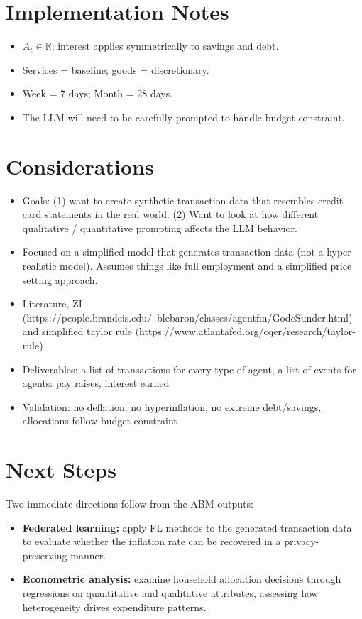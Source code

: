 \documentclass[12pt]{article}
\begin{document}
\section{Implementation Notes}
\begin{itemize}
\item $A_t\in\mathbb{R}$; interest applies symmetrically to savings and debt.
\item Services = baseline; goods = discretionary.
\item Week = 7 days; Month = 28 days.
\item The LLM will need to be carefully prompted to handle budget constraint.
\end{itemize}

\section{Considerations}
\begin{itemize}
    \item Goals: (1) want to create synthetic transaction data that resembles credit card statements in the real world. (2) Want to look at how different qualitative / quantitative prompting affects the LLM behavior.
    \item Focused on a simplified model that generates transaction data (not a hyper realistic model). Assumes things like full employment and a simplified price setting approach.
    \item Literature, ZI (https://people.brandeis.edu/~blebaron/classes/agentfin/GodeSunder.html) and simplified taylor rule (https://www.atlantafed.org/cqer/research/taylor-rule)
    \item Deliverables: a list of transactions for every type of agent, a list of events for agents: pay raises, interest earned
    \item Validation: no deflation, no hyperinflation, no extreme debt/savings, allocations follow budget constraint
\end{itemize}

\section{Next Steps}
Two immediate directions follow from the ABM outputs:

\begin{itemize}
    \item \textbf{Federated learning:} apply FL methods to the generated transaction data to evaluate whether the inflation rate can be recovered in a privacy-preserving manner.
    \item \textbf{Econometric analysis:} examine household allocation decisions through regressions on quantitative and qualitative attributes, assessing how heterogeneity drives expenditure patterns.
\end{itemize}
\end{document}
